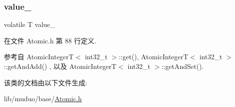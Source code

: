 \subsubsection{\texorpdfstring{value\+\_\+}{value\_}}
{\footnotesize\ttfamily volatile T value\+\_\+\hspace{0.3cm}{\ttfamily [private]}}



在文件 Atomic.\+h 第 88 行定义.



参考自 Atomic\+Integer\+T$<$ int32\+\_\+t $>$\+::get(), Atomic\+Integer\+T$<$ int32\+\_\+t $>$\+::get\+And\+Add() , 以及 Atomic\+Integer\+T$<$ int32\+\_\+t $>$\+::get\+And\+Set().



该类的文档由以下文件生成\+:\begin{DoxyCompactItemize}
\item 
lib/muduo/base/\hyperlink{Atomic_8h}{Atomic.\+h}\end{DoxyCompactItemize}
